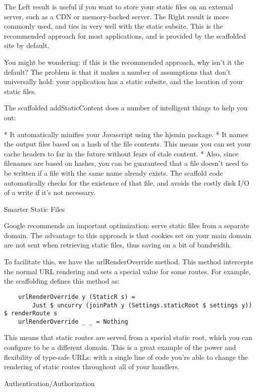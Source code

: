 The Left result is useful if you want to store your static files on an external server, such as a CDN or memory-backed server. The Right result is more commonly used, and ties in very well with the static subsite. This is the recommended approach for most applications, and is provided by the scaffolded site by default.

You might be wondering: if this is the recommended approach, why isn't it the default? The problem is that it makes a number of assumptions that don't universally hold: your application has a static subsite, and the location of your static files.

The scaffolded addStaticContent does a number of intelligent things to help you out:

* It automatically minifies your Javascript using the hjsmin package.
* It names the output files based on a hash of the file contents. This means you can set your cache headers to far in the future without fears of stale content.
* Also, since filenames are based on hashes, you can be guaranteed that a file doesn't need to be written if a file with the same name already exists. The scaffold code automatically checks for the existence of that file, and avoids the costly disk I/O of a write if it's not necessary.

Smarter Static Files

Google recommends an important optimization: serve static files from a separate domain. The advantage to this approach is that cookies set on your main domain are not sent when retrieving static files, thus saving on a bit of bandwidth.

To facilitate this, we have the urlRenderOverride method. This method intercepts the normal URL rendering and sets a special value for some routes. For example, the scaffolding defines this method as:

\begin{lstlisting}
    urlRenderOverride y (StaticR s) =
        Just $ uncurry (joinPath y (Settings.staticRoot $ settings y)) $ renderRoute s
    urlRenderOverride _ _ = Nothing
\end{lstlisting}%

This means that static routes are served from a special static root, which you can configure to be a different domain. This is a great example of the power and flexibility of type-safe URLs: with a single line of code you're able to change the rendering of static routes throughout all of your handlers.

Authentication/Authorization

